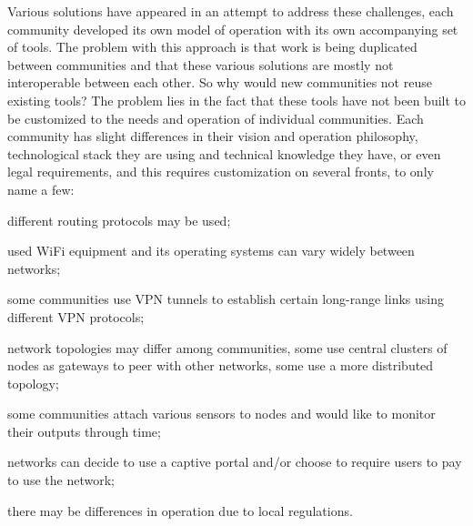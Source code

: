 \documentclass[5p,sort&compress]{elsarticle}
\begin{document}
Various solutions have appeared in an attempt to address these challenges, each community developed its own model of operation with its own accompanying set of tools.
The problem with this approach is that work is being duplicated between communities and that these various solutions are mostly not interoperable between each other.
So why would new communities not reuse existing tools?
The problem lies in the fact that these tools have not been built to be customized to the needs and operation of individual communities.
Each community has slight differences in their vision and operation philosophy, technological stack they are using and technical knowledge they have, or even legal requirements, and this requires customization on several fronts, to only name a few:
\begin{enumerate*}[label=\itshape\alph*\upshape)]
\item different routing protocols may be used;
\item used WiFi equipment and its operating systems can vary widely between networks;
\item some communities use VPN tunnels to establish certain long-range links using different VPN protocols;
\item network topologies may differ among communities, some use central clusters of nodes as gateways to peer with other networks, some use a more distributed topology;
\item some communities attach various sensors to nodes and would like to monitor their outputs through time;
\item networks can decide to use a captive portal and/or choose to require users to pay to use the network;
\item there may be differences in operation due to local regulations.
\end{enumerate*}
\end{document}
